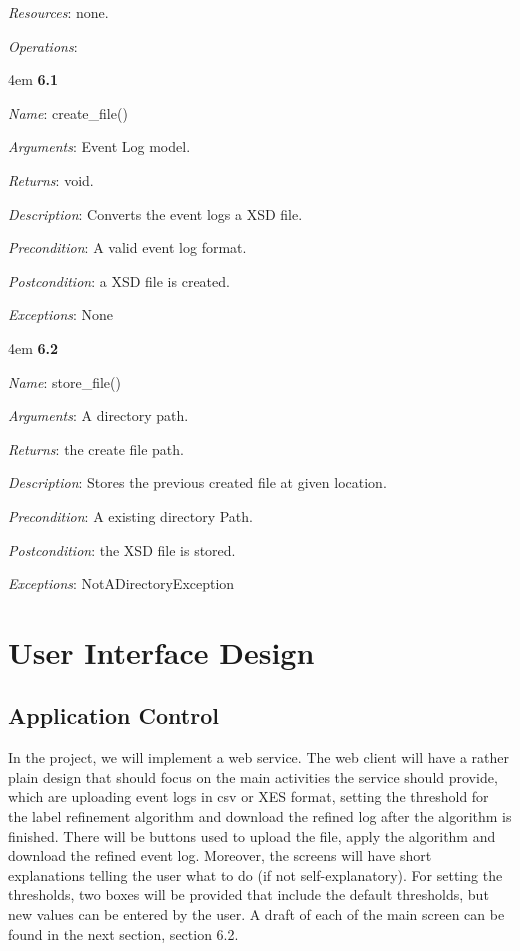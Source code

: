 \documentclass[notitlepage]{article}
\begin{document}
\begin{flushleft}
\textit{Resources}: none.

\textit{Operations}: 
\medskip
\par
\begingroup
\leftskip4em
\textbf{6.1} 

\textit{Name}: create\_file()

\textit{Arguments}: Event Log model.

\textit{Returns}: void.

\textit{Description}: Converts the event logs a XSD file.

\textit{Precondition}: A valid event log format.

\textit{Postcondition}: a XSD file is created.

\textit{Exceptions}: None
\par
\endgroup

\medskip
\par
\begingroup
\leftskip4em
\textbf{6.2} 

\textit{Name}: store\_file()

\textit{Arguments}: A directory path.

\textit{Returns}: the create file path.

\textit{Description}: Stores the previous created file at given location.

\textit{Precondition}: A existing directory Path.

\textit{Postcondition}: the XSD file is stored.

\textit{Exceptions}: NotADirectoryException
\par
\endgroup





\section{User Interface Design}
\subsection{Application Control}

In the project, we will implement a web service. The web client will have a rather plain design that should focus on the main activities the service should provide, which are uploading event logs in csv or XES format, setting the threshold for the label refinement algorithm and download the refined log after the algorithm is finished. There will be buttons used to upload the file, apply the algorithm and download the refined event log. Moreover, the screens will have short explanations telling the user what to do (if not self-explanatory). For setting the thresholds, two boxes will be provided that include the default thresholds, but new values can be entered by the user. A draft of each of the main screen can be found in the next section, section 6.2.


\end{flushleft}
\end{document}
